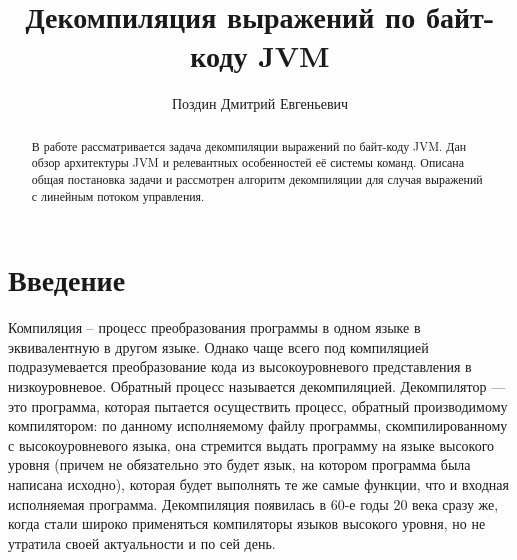 
\lstset{
language=llang
}

\title{Декомпиляция выражений по байт-коду JVM}
%
\author{Поздин Дмитрий Евгеньевич}
%
%
%

\maketitle              %

\begin{abstract}
В работе рассматривается задача декомпиляции выражений по байт-коду JVM. Дан
обзор архитектуры JVM и релевантных особенностей её системы команд.
Описана общая постановка задачи и рассмотрен алгоритм декомпиляции для случая
выражений с линейным потоком управления.
\end{abstract}
%


\section*{Введение}

Компиляция -- процесс преобразования программы в одном языке в эквивалентную в другом языке. 
Однако чаще всего под компиляцией подразумевается преобразование кода из высокоуровневого 
представления в низкоуровневое. Обратный процесс называется декомпиляцией. Декомпилятор --- 
это программа, которая пытается осуществить процесс, обратный производимому компилятором: 
по данному исполняемому файлу программы, скомпилированному с высокоуровневого языка, она стремится 
выдать программу на языке высокого уровня (причем не обязательно это будет язык, на котором программа 
была написана исходно), которая будет выполнять те же самые функции, что и входная исполняемая 
программа. Декомпиляция появилась в 60-е годы 20 века сразу же, когда стали широко применяться 
компиляторы языков высокого уровня, но не утратила своей актуальности и по сей день.

